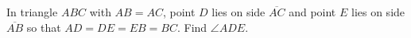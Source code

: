 In triangle $ABC$ with $AB=AC$, point $D$ lies on side $\overline{AC}$ and point $E$ lies on side $\overline{AB}$ so that $AD=DE=EB=BC$. Find $\angle ADE$.
